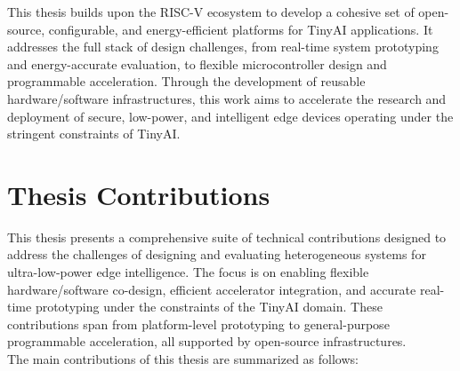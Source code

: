         This thesis builds upon the RISC-V ecosystem to develop a cohesive set of open-source, configurable, and energy-efficient platforms for TinyAI applications. It addresses the full stack of design challenges, from real-time system prototyping and energy-accurate evaluation, to flexible microcontroller design and programmable acceleration. Through the development of reusable hardware/software infrastructures, this work aims to accelerate the research and deployment of secure, low-power, and intelligent edge devices operating under the stringent constraints of TinyAI.

    \section{Thesis Contributions}
    
        This thesis presents a comprehensive suite of technical contributions designed to address the challenges of designing and evaluating heterogeneous systems for ultra-low-power edge intelligence. The focus is on enabling flexible hardware/software co-design, efficient accelerator integration, and accurate real-time prototyping under the constraints of the TinyAI domain. These contributions span from platform-level prototyping to general-purpose programmable acceleration, all supported by open-source infrastructures. \\
        
        The main contributions of this thesis are summarized as follows:
        
